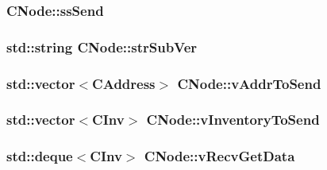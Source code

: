 \subsubsection[{ss\+Send}]{ C\+Node\+::ss\+Send}\label{class_c_node_a6174b5a3d8d8f6a2daf02be3cf04dc63}
\hypertarget{class_c_node_afb24fb33019af5c4085412fe3898cf01}{}
\subsubsection[{str\+Sub\+Ver}]{\setlength{\rightskip}{0pt plus 5cm}std\+::string C\+Node\+::str\+Sub\+Ver}\label{class_c_node_afb24fb33019af5c4085412fe3898cf01}
\hypertarget{class_c_node_a9b2d9b9182ff111c79f704594c4aa2e1}{}
\subsubsection[{v\+Addr\+To\+Send}]{\setlength{\rightskip}{0pt plus 5cm}std\+::vector$<${\bf C\+Address}$>$ C\+Node\+::v\+Addr\+To\+Send}\label{class_c_node_a9b2d9b9182ff111c79f704594c4aa2e1}
\hypertarget{class_c_node_abcd24c9478bc1ab5ba6de6b369080cec}{}
\subsubsection[{v\+Inventory\+To\+Send}]{\setlength{\rightskip}{0pt plus 5cm}std\+::vector$<${\bf C\+Inv}$>$ C\+Node\+::v\+Inventory\+To\+Send}\label{class_c_node_abcd24c9478bc1ab5ba6de6b369080cec}
\hypertarget{class_c_node_a9649c1f27ff0d8f0ba89eb1ea5bee139}{}
\subsubsection[{v\+Recv\+Get\+Data}]{\setlength{\rightskip}{0pt plus 5cm}std\+::deque$<${\bf C\+Inv}$>$ C\+Node\+::v\+Recv\+Get\+Data}\label{class_c_node_a9649c1f27ff0d8f0ba89eb1ea5bee139}
\hypertarget{class_c_node_a015361812daa5b6ebb9a5692ddf67a54}{}
